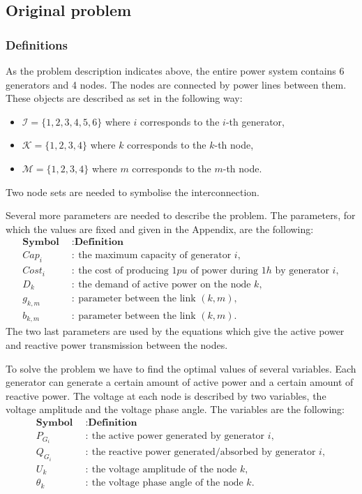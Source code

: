 \subsection{Original problem}
\subsubsection*{Definitions}


As the problem description indicates above, the entire power system contains 6 generators and 4 nodes. The nodes are connected by power lines between them. These objects are described as set in the following way:
\begin{itemize}
    \item $\mathcal{I} = \{1,2,3,4,5,6\}$ where $i$ corresponds to the $i$-th generator,
    \item $\mathcal{K}= \{1,2,3,4\}$ where $k$ corresponds to the $k$-th node,
    \item $\mathcal{M}= \{1,2,3,4\}$ where $m$ corresponds to the $m$-th node.
\end{itemize}
Two node sets are needed to symbolise the interconnection.

\vspace{3mm}
Several more parameters are needed to describe the problem. 
The parameters, for which the values are fixed and given in the Appendix, are the following:
\begin{align*}
\textbf{Symbol} \enspace &: \textbf{Definition}\\
Cap_i &: \ \text{the maximum capacity of generator } i, \\
Cost_i &: \ \text{the cost of producing } 1 pu \text{ of power during } 1 h \text{ by generator } i, \\
D_k &: \ \text{the demand of active power on the node } k, \\
g_{k,m} &: \ \text{parameter between the link } (k,m), \\
b_{k,m} &: \ \text{parameter between the link } (k,m).
\end{align*}
The two last parameters are used by the equations which give the active power and reactive power transmission between the nodes. 

\vspace{3mm}
To solve the problem we have to find the optimal values of several variables. Each generator can generate a certain amount of active power and a certain amount of reactive power. The voltage at each node is described by two variables, the voltage amplitude and the voltage phase angle. The variables are the following:
\begin{align*}
\textbf{Symbol} \enspace &: \textbf{Definition}\\
P_{G_i} &: \ \text{the active power generated by generator } i, \\
Q_{G_i} &: \ \text{the reactive power generated/absorbed by generator } i, \\
U_k &: \ \text{the voltage amplitude of the node } k, \\
\theta_k &: \ \text{the voltage phase angle of the node } k. 
\end{align*}

